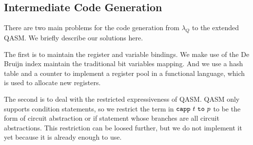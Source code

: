 \subsection{Intermediate Code Generation}
There are two main problems for the code generation from $\lambda_Q$ to the extended QASM. We briefly describe our solutions here.

The first is to maintain the register and variable bindings.
We make use of the De Bruijn index maintain the traditional bit variables mapping.
And we use a hash table and a counter to implement a register pool in a functional language, which is used to allocate new registers.

The second is to deal with the restricted expressiveness of QASM.
QASM only supports condition statements, so we restrict the term in $\mathtt{capp}\ t\ \mathtt{to}\ p$ to be the form of circuit abstraction or if statement whose branches are all circuit abstractions.
This restriction can be loosed further, but we do not implement it yet because it is already enough to use.